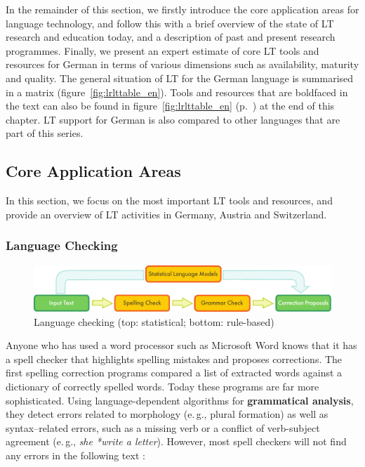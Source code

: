 \documentclass[]{../../metanetpaper}
\begin{document}
\begin{multicols}{2}
In the remainder of this section, we firstly introduce the core application areas for language technology, and follow this with a brief overview of the state of LT research and education today, and a description of past and present research programmes. Finally, we present an expert estimate of core LT tools and resources for German in terms of various dimensions such as availability, maturity and quality. The general situation of LT for the German language is summarised in a matrix (figure~\ref{fig:lrlttable_en}). Tools and resources that are boldfaced in the text can also be found in figure~\ref{fig:lrlttable_en} (p.~\pageref{fig:lrlttable_en}) at the end of this chapter. LT support for German is also compared to other languages that are part of this series.

\subsection{Core Application Areas}

In this section, we focus on the most important LT tools and resources, and provide an overview of LT activities in Germany, Austria and Switzerland. 

\subsubsection{Language Checking}

\begin{figure}[t]
  \center
  \includegraphics[width=\textwidth]{../_media/english/language_checking}
  \caption{Language checking (top: statistical; bottom: rule-based)}
  \label{fig:langcheckingaarch_en}
\end{figure}

Anyone who has used a word processor such as Microsoft Word knows that it has a spell checker that highlights spelling mistakes and proposes corrections. The first spelling correction programs compared a list of extracted words against a dictionary of correctly spelled words. Today these programs are far more sophisticated. Using language-dependent algorithms for \textbf{grammatical analysis}, they detect errors related to morphology (e.\,g., plural formation) as well as syntax–related errors, such as a missing verb or a conflict of verb-subject agreement (e.\,g., \textit{she *write a letter}). However, most spell checkers will not find any errors in the following text \cite{zar1}:


\end{multicols}
\end{document}
